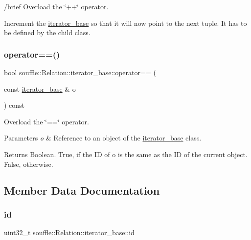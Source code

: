 /brief Overload the \char`\"{}++\char`\"{} operator.

Increment the \hyperlink{classsouffle_1_1_relation_1_1iterator__base}{iterator\+\_\+base} so that it will now point to the next tuple. It has to be defined by the child class. \mbox{\label{classsouffle_1_1_relation_1_1iterator__base_a045b6d7b09d4e5494aff9e27d1de7e04}} 
\subsubsection{\texorpdfstring{operator==()}{operator==()}}
{\footnotesize\ttfamily bool souffle\+::\+Relation\+::iterator\+\_\+base\+::operator== (\begin{DoxyParamCaption}\item[{const \hyperlink{classsouffle_1_1_relation_1_1iterator__base}{iterator\+\_\+base} \&}]{o }\end{DoxyParamCaption}) const\hspace{0.3cm}{\ttfamily [inline]}}

Overload the \char`\"{}==\char`\"{} operator. 
\begin{DoxyParams}{Parameters}
{\em o} & Reference to an object of the \hyperlink{classsouffle_1_1_relation_1_1iterator__base}{iterator\+\_\+base} class. \\
\hline
\end{DoxyParams}
\begin{DoxyReturn}{Returns}
Boolean. True, if the ID of o is the same as the ID of the current object. False, otherwise. 
\end{DoxyReturn}


\subsection{Member Data Documentation}
\mbox{\label{classsouffle_1_1_relation_1_1iterator__base_a43f50972f2975e49d08634ff0af7b664}} 
\subsubsection{\texorpdfstring{id}{id}}
{\footnotesize\ttfamily uint32\+\_\+t souffle\+::\+Relation\+::iterator\+\_\+base\+::id\hspace{0.3cm}{\ttfamily [protected]}}

